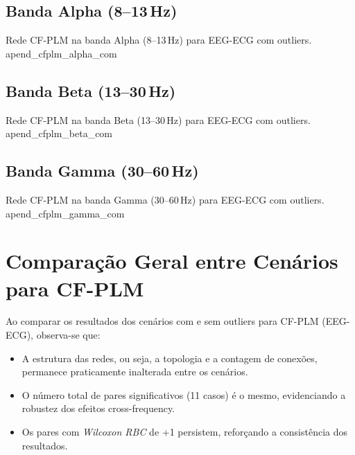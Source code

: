 \begin{apendicesenv}
  \subsection{Banda Alpha (8--13\,Hz)}
  {Rede CF-PLM na banda Alpha (8--13\,Hz) para EEG-ECG com outliers.}
  {apend_cfplm_alpha_com}
  
  \subsection{Banda Beta (13--30\,Hz)}
  {Rede CF-PLM na banda Beta (13--30\,Hz) para EEG-ECG com outliers.}
  {apend_cfplm_beta_com}
  
  \subsection{Banda Gamma (30--60\,Hz)}
  {Rede CF-PLM na banda Gamma (30--60\,Hz) para EEG-ECG com outliers.}
  {apend_cfplm_gamma_com}
  
  \section{Comparação Geral entre Cenários para CF-PLM}
  Ao comparar os resultados dos cenários com e sem outliers para CF-PLM (EEG-ECG), observa-se que:
  \begin{itemize}
      \item A estrutura das redes, ou seja, a topologia e a contagem de conexões, permanece praticamente inalterada entre os cenários.
      \item O número total de pares significativos (11 casos) é o mesmo, evidenciando a robustez dos efeitos cross-frequency.
      \item Os pares com \emph{Wilcoxon RBC} de +1 persistem, reforçando a consistência dos resultados.
  \end{itemize}
  
\end{apendicesenv}
